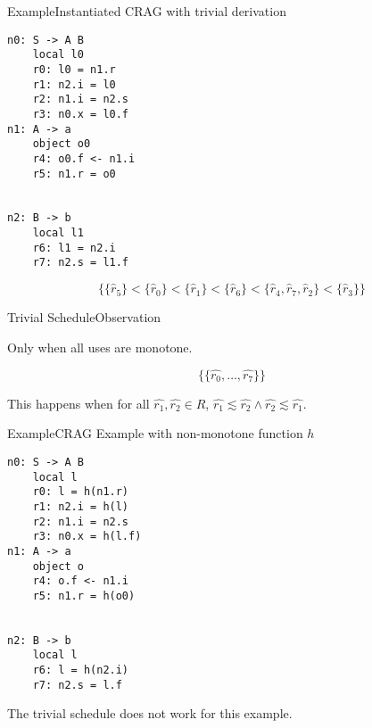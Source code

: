 \begin{frame}[fragile=singleslide]{Example}{Instantiated CRAG with trivial derivation}

\begin{multicols}{3}
\begin{Verbatim}[fontsize=\small]
n0: S -> A B
    local l0
    r0: l0 = n1.r
    r1: n2.i = l0
    r2: n1.i = n2.s
    r3: n0.x = l0.f
n1: A -> a
    object o0
    r4: o0.f <- n1.i
    r5: n1.r = o0


n2: B -> b
    local l1
    r6: l1 = n2.i
    r7: n2.s = l1.f
\end{Verbatim}
\end{multicols}

\[
     \Big \{ \{ \hat{r}_5 \} < \{ \hat{r}_0 \} < \{ \hat{r}_1 \} < \{ \hat{r}_6 \} < \{ \hat{r}_4 , \hat{r}_7, \hat{r}_2 \} < \{ \hat{r}_3 \}  \Big \}
\]

\end{frame}



\begin{frame}{Trivial Schedule}{Observation}

Only when \alert{all uses are monotone}. 

$$ \Big\{ \{ \hat{r_0}, \dots, \hat{r_7} \} \Big \}$$

This happens when for all $\hat{r_1}, \hat{r_2} \in \hat{R}$, $\hat{r_1} \lesssim \hat{r_2} \wedge \hat{r_2} \lesssim \hat{r_1}$.

\end{frame}




\begin{frame}[fragile=singleslide]{Example}{CRAG Example with non-monotone function $h$}

\begin{multicols}{3}
\begin{Verbatim}[fontsize=\small]
n0: S -> A B
    local l
    r0: l = h(n1.r)
    r1: n2.i = h(l)
    r2: n1.i = n2.s
    r3: n0.x = h(l.f)
n1: A -> a
    object o
    r4: o.f <- n1.i
    r5: n1.r = h(o0)


n2: B -> b
    local l
    r6: l = h(n2.i)
    r7: n2.s = l.f
\end{Verbatim}
\end{multicols}

\newlinevspace

The trivial schedule \alert{does not work} for this example.

\end{frame}

